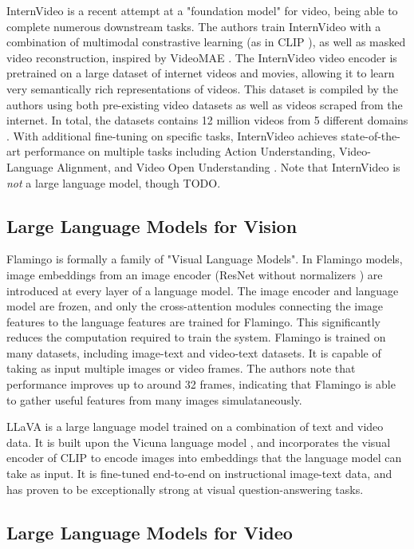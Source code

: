 InternVideo is a recent attempt at a "foundation model" for video, being able to complete numerous downstream tasks.
The authors train InternVideo with a combination of multimodal constrastive learning (as in CLIP \cite{clip}), as well as masked video reconstruction, inspired by VideoMAE \cite{videomae}.
The InternVideo video encoder is pretrained on a large dataset of internet videos and movies, allowing it to learn very semantically rich representations of videos.
This dataset is compiled by the authors using both pre-existing video datasets as well as videos scraped from the internet. In total, the datasets contains 12 million videos from 5 different domains \cite{internvideo}.
With additional fine-tuning on specific tasks, InternVideo achieves state-of-the-art performance on multiple tasks including Action Understanding, Video-Language Alignment, and Video Open Understanding \cite{internvideo}.
Note that InternVideo is \textit{not} a large language model, though TODO.

\subsection{Large Language Models for Vision}

Flamingo is formally a family of "Visual Language Models".
In Flamingo models, image embeddings from an image encoder (ResNet without normalizers \cite{nfnet}) are introduced at every layer of a language model.
The image encoder and language model are frozen, and only the cross-attention modules connecting the image features to the language features are trained for Flamingo.
This significantly reduces the computation required to train the system.
Flamingo is trained on many datasets, including image-text and video-text datasets. It is capable of taking as input multiple images or video frames. 
The authors note that performance improves up to around 32 frames, indicating that Flamingo is able to gather useful features from many images simulataneously.

LLaVA \cite{llava} is a large language model trained on a combination of text and video data.
It is built upon the Vicuna language model \cite{vicuna}, and incorporates the visual encoder of CLIP \cite{clip} to encode images into embeddings that the language model can take as input.
It is fine-tuned end-to-end on instructional image-text data, and has proven to be exceptionally strong at visual question-answering tasks.

\subsection{Large Language Models for Video}

